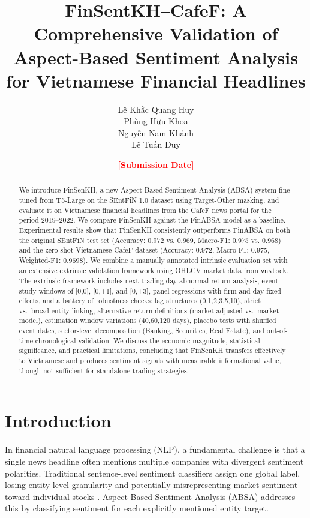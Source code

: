 \documentclass[12pt,a4paper]{article}
\newcommand{\placeholder}[1]{\textcolor{red}{\textbf{[#1]}}}
\begin{document}
\title{FinSentKH--CafeF: A Comprehensive Validation of Aspect-Based Sentiment Analysis \\
for Vietnamese Financial Headlines}
\author{\small Lê Khắc Quang Huy \\
Phùng Hữu Khoa \\
Nguyễn Nam Khánh \\
Lê Tuấn Duy}
\date{\placeholder{Submission Date}}

\maketitle

\begin{abstract}
We introduce FinSenKH, a new Aspect-Based Sentiment Analysis (ABSA) system fine-tuned from T5-Large on the SEntFiN 1.0 dataset using Target-Other masking, and evaluate it on Vietnamese financial headlines from the CafeF news portal for the period 2019--2022. We compare FinSenKH against the FinABSA model \cite{son2023removing} as a baseline. Experimental results show that FinSenKH consistently outperforms FinABSA on both the original SEntFiN test set (Accuracy: 0.972 vs. 0.969, Macro-F1: 0.975 vs. 0.968) and the zero-shot Vietnamese CafeF dataset (Accuracy: 0.972, Macro-F1: 0.975, Weighted-F1: 0.9698). We combine a manually annotated intrinsic evaluation set with an extensive extrinsic validation framework using OHLCV market data from \texttt{vnstock}. The extrinsic framework includes next-trading-day abnormal return analysis, event study windows of [0,0], [0,+1], and [0,+3], panel regressions with firm and day fixed effects, and a battery of robustness checks: lag structures (0,1,2,3,5,10), strict vs.\ broad entity linking, alternative return definitions (market-adjusted vs.\ market-model), estimation window variations (40,60,120 days), placebo tests with shuffled event dates, sector-level decomposition (Banking,\allowbreak{} Securities,\allowbreak{} Real Estate), and out-of-time chronological validation.
We discuss the economic magnitude, statistical significance, and practical limitations, concluding that FinSenKH transfers effectively to Vietnamese and produces sentiment signals with measurable informational value, though not sufficient for standalone trading strategies.
\end{abstract}

\section{Introduction}
In financial natural language processing (NLP), a fundamental challenge is that a single news headline often mentions multiple companies with divergent sentiment polarities. Traditional sentence-level sentiment classifiers assign one global label, losing entity-level granularity and potentially misrepresenting market sentiment toward individual stocks \cite{son2023removing}. Aspect-Based Sentiment Analysis (ABSA) addresses this by classifying sentiment for each explicitly mentioned entity target.
\end{document}
